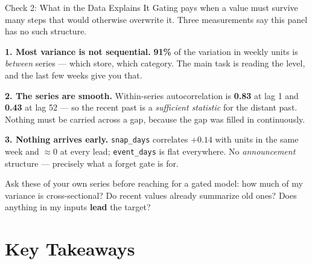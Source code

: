 \documentclass[aspectratio=169, 11pt]{beamer}
\begin{document}
\begin{frame}{Check 2: What in the Data Explains It}
  Gating pays when a value must survive many steps that would otherwise overwrite it. Three
  measurements say this panel has no such structure.

  \vspace{0.08cm}
  {\small
  \textbf{1. Most variance is not sequential.} \textbf{91\%} of the variation in weekly units is
  \emph{between} series --- which store, which category. The main task is reading the level, and
  the last few weeks give you that.

  \vspace{0.06cm}
  \textbf{2. The series are smooth.} Within-series autocorrelation is \textbf{0.83} at lag 1 and
  \textbf{0.43} at lag 52 --- so the recent past is a \emph{sufficient statistic} for the distant
  past. Nothing must be carried across a gap, because the gap was filled in continuously.

  \vspace{0.06cm}
  \textbf{3. Nothing arrives early.} \texttt{snap\_days} correlates $+0.14$ with units in the
  same week and $\approx 0$ at every lead; \texttt{event\_days} is flat everywhere. No
  \emph{announcement} structure --- precisely what a forget gate is for.
  }

  \begin{keybox}
    {\small Ask these of your own series before reaching for a gated model: how much of my
    variance is cross-sectional? Do recent values already summarize old ones? Does anything in my
    inputs \textbf{lead} the target?}
  \end{keybox}
\end{frame}

\section{Key Takeaways}

\end{document}
